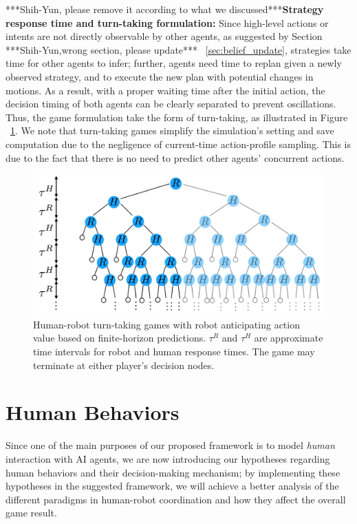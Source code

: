 \documentclass[letterpaper, 10 pt, conference]{ieeeconf}  %
\begin{document}
***Shih-Yun, please remove it according to what we discussed***\textbf{Strategy response time and turn-taking formulation:}
Since high-level actions or intents are not directly observable by other 
agents, as suggested by Section ***Shih-Yun,wrong section, please update*** ~\ref{sec:belief_update}, strategies take time 
for other agents to infer; further, agents need time to replan given a newly observed strategy, and to execute the new plan with potential changes in motions. As a result, with a proper waiting time after the initial action, the decision timing of both agents can be clearly separated to prevent oscillations. Thus, the game formulation take the form of turn-taking, as illustrated in Figure ~\ref{fig:turn_taking}. 
We note that turn-taking games simplify the simulation's setting and save computation due to the negligence of current-time action-profile sampling. This is due to the fact that there is no need to predict other agents' concurrent actions. 
\begin{figure}[t]
      \centering
      \vspace{-1em}
      \includegraphics[scale=0.2]{turn_taking}
      \vspace{-1.4em}
      \caption{
        Human-robot turn-taking games with robot anticipating action value based on finite-horizon predictions. $\tau^R$ and $\tau^H$ are approximate time intervals for robot and human response times. The game may terminate at either player's decision nodes.}
      \vspace{-1.7em}
     \label{fig:turn_taking}
\end{figure}
\section{Human Behaviors}\label{sec:human_behavior}
Since one of the main purposes of our proposed framework is to model 
\textit{human} interaction with AI agents, we are now introducing our 
hypotheses regarding human behaviors and their decision-making mechanism; by implementing these hypotheses in the suggested framework, we will achieve a better analysis of the different paradigms in human-robot coordination and how they affect the overall game result.
\vspace{-.2em}
\end{document}
